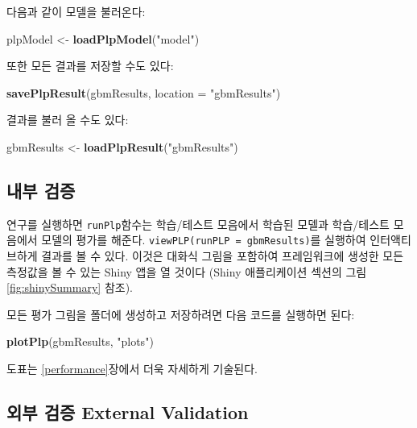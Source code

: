 \documentclass[10.5pt]{book}
\newenvironment{Shaded}{\begin{snugshade}}{\end{snugshade}}
\newcommand{\KeywordTok}[1]{\textcolor[rgb]{0.13,0.29,0.53}{\textbf{#1}}}
\newcommand{\DataTypeTok}[1]{\textcolor[rgb]{0.13,0.29,0.53}{#1}}
\newcommand{\StringTok}[1]{\textcolor[rgb]{0.31,0.60,0.02}{#1}}
\newcommand{\NormalTok}[1]{#1}
\theoremstyle{definition}
\theoremstyle{definition}
\theoremstyle{definition}
\theoremstyle{remark}
\begin{document}
다음과 같이 모델을 불러온다:

\begin{Shaded}
\begin{Highlighting}[]
\NormalTok{plpModel <-}\StringTok{ }\KeywordTok{loadPlpModel}\NormalTok{(}\StringTok{"model"}\NormalTok{)}
\end{Highlighting}
\end{Shaded}

또한 모든 결과를 저장할 수도 있다:

\begin{Shaded}
\begin{Highlighting}[]
\KeywordTok{savePlpResult}\NormalTok{(gbmResults, }\DataTypeTok{location =} \StringTok{"gbmResults"}\NormalTok{)}
\end{Highlighting}
\end{Shaded}

결과를 불러 올 수도 있다:

\begin{Shaded}
\begin{Highlighting}[]
\NormalTok{gbmResults <-}\StringTok{ }\KeywordTok{loadPlpResult}\NormalTok{(}\StringTok{"gbmResults"}\NormalTok{)}
\end{Highlighting}
\end{Shaded}

\subsection{내부 검증}\label{-}

연구를 실행하면 \texttt{runPlp}함수는 학습/테스트 모음에서 학습된 모델과
학습/테스트 모음에서 모델의 평가를 해준다.
\texttt{viewPLP(runPLP\ =\ gbmResults)}를 실행하여 인터액티브하게 결과를
볼 수 있다. 이것은 대화식 그림을 포함하여 프레임워크에 생성한 모든
측정값을 볼 수 있는 Shiny 앱을 열 것이다 (Shiny 애플리케이션 섹션의 그림
\ref{fig:shinySummary} 참조).

모든 평가 그림을 폴더에 생성하고 저장하려면 다음 코드를 실행하면 된다:

\begin{Shaded}
\begin{Highlighting}[]
\KeywordTok{plotPlp}\NormalTok{(gbmResults, }\StringTok{"plots"}\NormalTok{)}
\end{Highlighting}
\end{Shaded}

도표는 \ref{performance}장에서 더욱 자세하게 기술된다.

\subsection{외부 검증 External Validation}\label{--external-validation}
\end{document}
